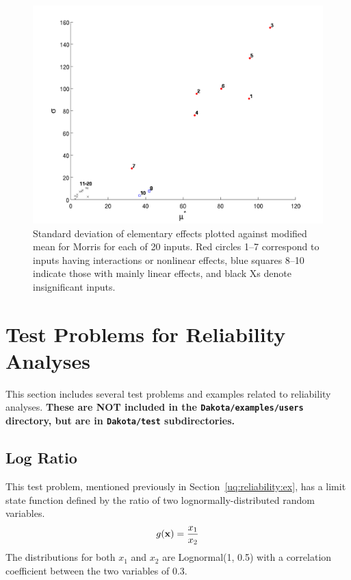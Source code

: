 \begin{figure}[ht!]
\centering
\includegraphics[width=\textwidth]{images/moat_mustar_sigma}
\caption{\label{FIG:mustar_sigma} Standard deviation of elementary
effects plotted against modified mean for Morris for each of 20
inputs. Red circles 1--7 correspond to inputs having interactions or
nonlinear effects, blue squares 8--10 indicate those with mainly
linear effects, and black Xs denote insignificant inputs.}
\end{figure}

\clearpage
\section{Test Problems for Reliability Analyses}\label{additional:reliabilityproblems}
This section includes several test problems and examples related to 
reliability analyses. {\bf These are NOT included in the {\tt Dakota/examples/users} 
directory, but are in {\tt Dakota/test} subdirectories.}


\subsection{Log Ratio}\label{additional:logratio}

This test problem, mentioned previously in
Section~\ref{uq:reliability:ex}, has a limit state function defined by
the ratio of two lognormally-distributed random variables.
\begin{equation}
g({\bf x}) = \frac{x_1}{x_2}
\end{equation}
The distributions for both $x_1$ and $x_2$ are Lognormal(1, 0.5) with
a correlation coefficient between the two variables of 0.3.

